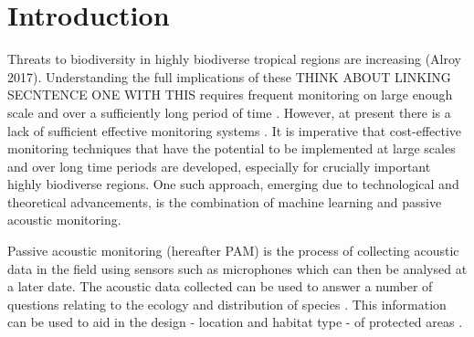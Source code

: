 \documentclass[11pt]{article}
\begin{document}
\doublespacing

\section{Introduction}
Threats to biodiversity in highly biodiverse tropical regions are increasing (Alroy 2017). Understanding the full implications of these THINK ABOUT LINKING SECNTENCE ONE WITH THIS requires frequent monitoring on large enough scale \citep{underwood2005large,porter2009new} and over a sufficiently long period of time \citep{porter2005wireless}. However, at present there is a lack of sufficient effective monitoring systems \citep{proencca2017global}. It is imperative that cost-effective monitoring techniques that have the potential to be implemented at large scales and over long time periods are developed, especially for crucially important highly biodiverse regions. One such approach, emerging due to technological and theoretical advancements, is the combination of machine learning and passive acoustic monitoring.


Passive acoustic monitoring (hereafter PAM) is the process of collecting acoustic data in the field using sensors such as microphones which can then be analysed at a later date. The acoustic data collected can be used to answer a number of questions relating to the ecology and distribution of species \citep{mellinger2011confirmation, bader2015mobility, davies2016ultrasonic,campos2016improving}. This information can be used to aid in the design - location and habitat type - of protected areas \citep{rayment2009use}. 
\end{document}
